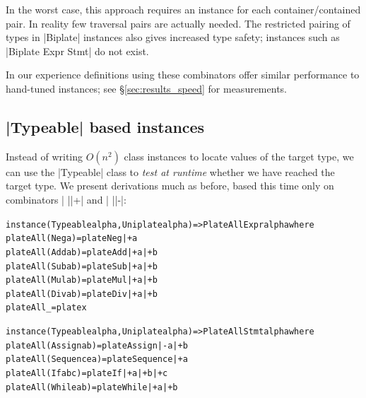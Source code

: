 \documentclass[preprint]{sigplanconf}
\newenvironment{code}{\begin{alltt}\small}{\end{alltt}}
\newcommand{\ignore}{}
\begin{document}
In the worst case, this approach requires an instance for each container/contained pair. In reality few traversal pairs are actually needed. The restricted pairing of types in |Biplate| instances also gives increased type safety; instances such as \ignore|Biplate Expr Stmt| do not exist.

In our experience definitions using these combinators offer similar performance to hand-tuned instances; see \S\ref{sec:results_speed} for measurements.


\subsection{|Typeable| based instances}
\label{sec:implement_playtypeable}

Instead of writing $O(n^2)$ class instances to locate values of the target type, we can use the |Typeable| class to \textit{test at runtime} whether we have reached the target type. We present derivations much as before, based this time only on combinators | ||+| and | ||-|:

\begin{code}
instance (Typeable alpha, Uniplate alpha) => PlateAll Expr alpha where
    plateAll (Neg a    )  = plate Neg  |+ a
    plateAll (Add a b  )  = plate Add  |+ a |+ b
    plateAll (Sub a b  )  = plate Sub  |+ a |+ b
    plateAll (Mul a b  )  = plate Mul  |+ a |+ b
    plateAll (Div a b  )  = plate Div  |+ a |+ b
    plateAll _            = plate x

instance (Typeable alpha, Uniplate alpha) => PlateAll Stmt alpha where
    plateAll (Assign    a b    ) = plate Assign    |-  a |+ b
    plateAll (Sequence  a      ) = plate Sequence  |+  a
    plateAll (If        a b c  ) = plate If        |+  a |+ b |+ c
    plateAll (While     a b    ) = plate While     |+  a |+ b
\end{code}
\end{document}
